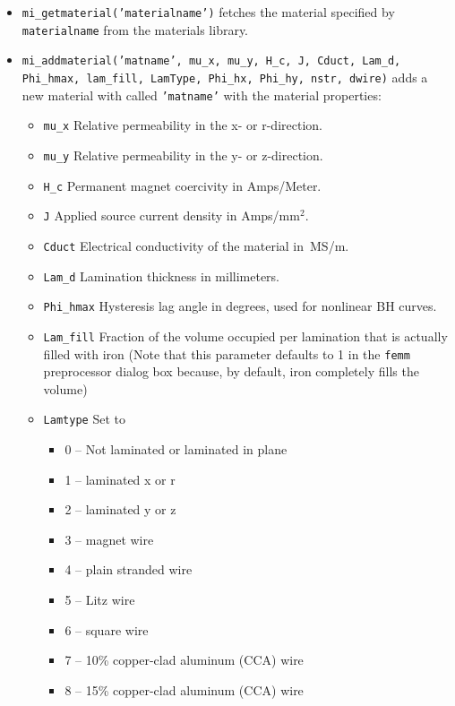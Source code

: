 \begin{itemize}
\item \texttt{mi\_getmaterial('materialname')} fetches the material specified by \texttt{materialname} 
from the materials library.

\item{\tt mi\_addmaterial('matname', mu{\_}x, mu{\_}y, H{\_}c,
J, Cduct, Lam{\_}d, Phi{\_}hmax, lam{\_}fill, LamType, Phi{\_}hx, Phi{\_}hy, nstr, dwire)} adds a
new material with called {\tt 'matname'} with the material
properties:
        \begin{itemize}
        \item{\tt mu{\_}x} Relative permeability in the x- or r-direction.
        \item{\tt mu{\_}y} Relative permeability in the y- or z-direction.
        \item{\tt H{\_}c} Permanent magnet coercivity in
        Amps/Meter.
        \item{\tt J} Applied source current
        density in Amps/mm$^2$.
        \item{\tt Cduct} Electrical conductivity of the material
        in~MS/m.
        \item{\tt Lam{\_}d} Lamination thickness in millimeters.
        \item{\tt Phi\_hmax} Hysteresis lag angle in degrees, used for nonlinear BH curves.
        \item{\tt Lam{\_}fill} Fraction of the volume occupied per lamination that
        is actually filled with iron (Note that this parameter defaults to 1 in the
        {\tt femm} preprocessor dialog box because, by default, iron completely
        fills the volume)
        \item{\tt Lamtype} Set to
                \begin{itemize}
                \item 0 -- Not laminated or laminated in plane
                \item 1 -- laminated x or r
                \item 2 -- laminated y or z
                \item 3 -- magnet wire
                \item 4 -- plain stranded wire
                \item 5 -- Litz wire
                \item 6 -- square wire
                \item 7 -- 10\% copper-clad aluminum (CCA) wire
                \item 8 -- 15\% copper-clad aluminum (CCA) wire

\end{itemize}
\end{itemize}
\end{itemize}
